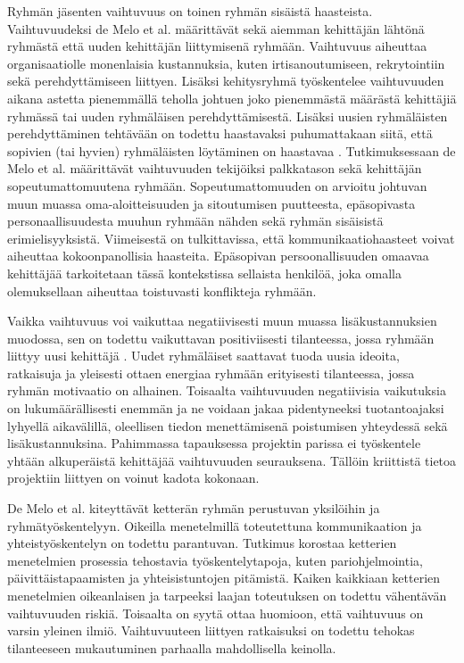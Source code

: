 Ryhmän jäsenten vaihtuvuus on toinen ryhmän sisäistä haasteista. Vaihtuvuudeksi de Melo et al. \cite{DEOMELO2013412} määrittävät sekä aiemman kehittäjän lähtönä ryhmästä että uuden kehittäjän liittymisenä ryhmään. Vaihtuvuus aiheuttaa organisaatiolle monenlaisia kustannuksia, kuten irtisanoutumiseen, rekrytointiin sekä perehdyttämiseen liittyen. Lisäksi kehitysryhmä työskentelee vaihtuvuuden aikana astetta pienemmällä teholla johtuen joko pienemmästä määrästä kehittäjiä ryhmässä tai uuden ryhmäläisen perehdyttämisestä. Lisäksi uusien ryhmäläisten perehdyttäminen tehtävään on todettu haastavaksi \cite{SELLERISILVA201520} puhumattakaan siitä, että sopivien (tai hyvien) ryhmäläisten löytäminen on haastavaa \cite{GREGORY201692}. Tutkimuksessaan de Melo et al. \cite{DEOMELO2013412} määrittävät vaihtuvuuden tekijöiksi palkkatason sekä kehittäjän sopeutumattomuutena ryhmään. Sopeutumattomuuden on arvioitu johtuvan muun muassa oma-aloitteisuuden ja sitoutumisen puutteesta, epäsopivasta personaallisuudesta muuhun ryhmään nähden sekä ryhmän sisäisistä erimielisyyksistä. Viimeisestä on tulkittavissa, että kommunikaatiohaasteet voivat aiheuttaa kokoonpanollisia haasteita. Epäsopivan persoonallisuuden omaavaa kehittäjää tarkoitetaan tässä kontekstissa sellaista henkilöä, joka omalla olemuksellaan aiheuttaa toistuvasti konflikteja ryhmään.

Vaikka vaihtuvuus voi vaikuttaa negatiivisesti muun muassa lisäkustannuksien muodossa, sen on todettu vaikuttavan positiviisesti tilanteessa, jossa ryhmään liittyy uusi kehittäjä \cite{DEOMELO2013412}. Uudet ryhmäläiset saattavat tuoda uusia ideoita, ratkaisuja ja yleisesti ottaen energiaa ryhmään erityisesti tilanteessa, jossa ryhmän motivaatio on alhainen. Toisaalta vaihtuvuuden negatiivisia vaikutuksia on lukumäärällisesti enemmän ja ne voidaan jakaa pidentyneeksi tuotantoajaksi lyhyellä aikavälillä, oleellisen tiedon menettämisenä poistumisen yhteydessä sekä lisäkustannuksina. Pahimmassa tapauksessa projektin parissa ei työskentele yhtään alkuperäistä kehittäjää vaihtuvuuden seurauksena. Tällöin kriittistä tietoa projektiin liittyen on voinut kadota kokonaan.

De Melo et al. \cite{DEOMELO2013412} kiteyttävät ketterän ryhmän perustuvan yksilöihin ja ryhmätyöskentelyyn. Oikeilla menetelmillä toteutettuna kommunikaation ja yhteistyöskentelyn on todettu parantuvan. Tutkimus korostaa ketterien menetelmien prosessia tehostavia työskentelytapoja, kuten pariohjelmointia, päivittäistapaamisten ja yhteisistuntojen pitämistä. Kaiken kaikkiaan ketterien menetelmien oikeanlaisen ja tarpeeksi laajan toteutuksen on todettu vähentävän vaihtuvuuden riskiä. Toisaalta on syytä ottaa huomioon, että vaihtuvuus on varsin yleinen ilmiö. Vaihtuvuuteen liittyen ratkaisuksi on todettu tehokas tilanteeseen mukautuminen parhaalla mahdollisella keinolla.
